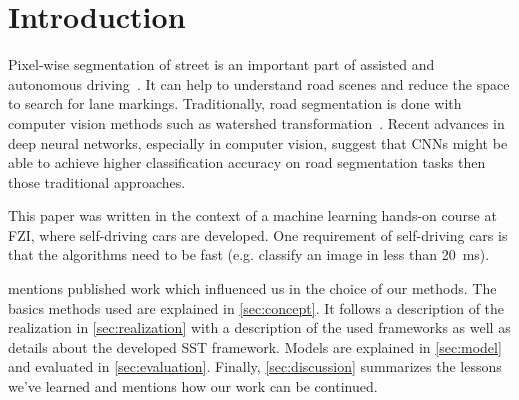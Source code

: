 
\section{Introduction}
\label{sec:introduction}
Pixel-wise segmentation of street is an important part of assisted and
autonomous driving~\cite{Tarel2009}. It can help to understand road scenes and
reduce the space to search for lane markings. Traditionally, road segmentation
is done with computer vision methods such as watershed
transformation~\cite{Beucher1990}. Recent advances in deep neural networks,
especially in computer vision, suggest that \glspl{CNN} might be able to
achieve higher classification accuracy on road segmentation tasks then those
traditional approaches.

This paper was written in the context of a machine learning hands-on course
at FZI, where self-driving cars are developed. One requirement of self-driving
cars is that the algorithms need to be fast (e.g. classify an image in less
than \SI{20}{\milli\second}).

 mentions published work which influenced us in the
choice of our methods. The basics methods used are explained in
\cref{sec:concept}. It follows a description of the realization in
\cref{sec:realization} with a description of the used frameworks as well as
details about the developed SST framework. Models are explained in
\cref{sec:model} and evaluated in \cref{sec:evaluation}. Finally,
\cref{sec:discussion} summarizes the lessons we've learned and mentions how
our work can be continued.